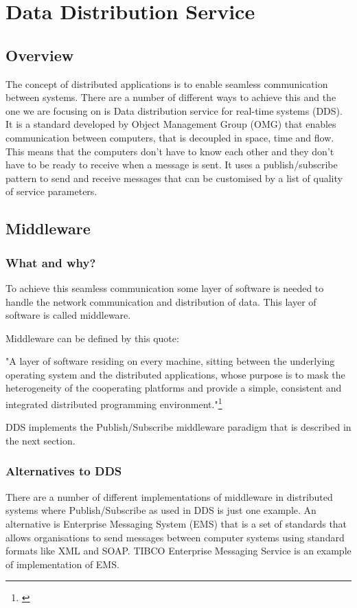 \chapter{Data Distribution Service}
\section{Overview}
The concept of distributed applications is to enable seamless communication between systems. There are a number of different ways to achieve this and the one we are focusing on is Data distribution service for real-time systems (DDS).
It is a standard developed by Object Management Group (OMG) that enables communication between computers, that is decoupled in space, time and flow. This means that the computers don't have to know each other and they don't have to be ready to receive when a message is sent. It uses a publish/subscribe pattern to send and receive messages that can be customised by a list of quality of service parameters.

\section{Middleware}

\subsection{What and why?}
To achieve this seamless communication some layer of software is needed to handle the network communication and distribution of data. This layer of software is called middleware.

Middleware can be defined by this quote:

"A layer of software residing on every machine, sitting between the
underlying operating system and the distributed applications,
whose purpose is to mask the heterogeneity of the cooperating
platforms and provide a simple, consistent and integrated
distributed programming environment."\footnote{\citep{Distributed Systems}}

DDS implements the Publish/Subscribe middleware paradigm that is described in the next section.

\subsection{Alternatives to DDS}

There are a number of different implementations of middleware in distributed systems where Publish/Subscribe as used in DDS is just one example. An alternative is Enterprise Messaging System (EMS) that is a set of standards that allows organisations to send messages between computer systems using standard formats like XML and SOAP.
TIBCO Enterprise Messaging Service is an example of implementation of EMS.

